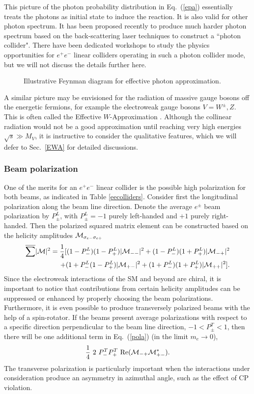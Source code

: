 \documentclass[prd,aps,floats,preprintnumbers,preprint,superscriptaddress,floatfix,nofootinbib]{revtex4}
\def\cM{{\cal M}}
\def\epem{e^+e^-}
\def\bea{\begin{eqnarray}}
\def\eea{\end{eqnarray}}
\begin{document}
This picture of the photon probability distribution  in Eq.~(\ref{epa}) 
essentially treats the photons as initial state to induce the reaction. 
It is also valid for other photon spectrum.
It has been proposed recently to produce much harder photon spectrum
based on the back-scattering laser techniques \cite{gamma} to
construct a ``photon collider". There have been dedicated workshops to
study the physics opportunities for $\epem$ linear colliders operating
in such a photon collider mode, but we will not discuss the details further here. 

\begin{center}
\begin{figure}[tb]
\hskip 1.2cm
\caption{Illustrative Feynman diagram for effective photon approximation.
\label{fig:ea}}
\end{figure}
\end{center}

A similar picture may be envisioned for the radiation of massive gauge
bosons off the energetic fermions, for example the electroweak gauge bosons
$V=W^\pm,Z$. This is often called the Effective $W$-Approximation \cite{sally,gordy}.
Although the collinear radiation would not be
a good approximation until reaching very high energies $\sqrt s\gg M_V$,
it is instructive to consider the qualitative features, which we will defer 
to Sec.~\ref{EWA} for detailed discussions.

\subsubsection{Beam polarization}
One of the merits for an $\epem$ linear collider is the possible high
polarization for both beams, as indicated in Table \ref{eecolliders}.
Consider first  the  longitudinal polarization along the beam line
direction.  Denote the average $e^\pm$ beam polarization by $P^L_\pm$, with 
$P^L_\pm=-1$ purely left-handed and  $+1$ purely right-handed. Then the
polarized squared matrix element can be constructed \cite{polar}
based on the helicity amplitudes $\cM_{\sigma_{e-} \sigma_{e+} }$
\bea
\nonumber
\overline{\sum} |\cM|^2 = {1\over 4}[
(1-P^L_-)(1-P^L_+) |\cM_{- -} |^2 +
(1-P^L_-)(1+P^L_+) |\cM_{- +}|^2 \\
+ (1+P^L_-(1-P^L_+) |\cM_{+ -}|^2 +
(1+P^L_-)(1+P^L_+) |\cM_{+ +}|^2 ].
\label{pola}
\eea
Since the electroweak interactions of the SM and beyond are chiral,
it is important to notice that contributions from certain helicity
amplitudes can be suppressed or enhanced by properly choosing
the beam polarizations. Furthermore, it is even possible to produce
transversely polarized beams with the help of a spin-rotator. If the 
beams present  average polarizations with respect to a specific 
direction perpendicular to the beam line direction, $-1 < P_\pm^T < 1$,
then there will be one additional term in Eq.~(\ref{pola})
(in the limit  $m_e\to 0$),
\bea
\nonumber
{1\over 4}\ 2\ P^T_- P^T_+\ {\rm Re}( \cM_{-+}\cM_{+-}^*).
\eea
The transverse polarization is particularly important when the
interactions under consideration produce an asymmetry in
azimuthal angle, such as the effect of CP violation.
\end{document}
